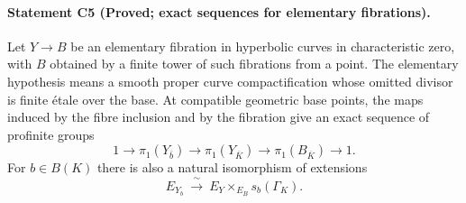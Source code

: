 \paragraph{Statement C5 (Proved; exact sequences for elementary fibrations).}\label{res:C5}
Let $Y\to B$ be an elementary fibration in hyperbolic curves in characteristic zero, with $B$ obtained by a finite tower of such fibrations from a point. The elementary hypothesis means a smooth proper curve compactification whose omitted divisor is finite étale over the base. At compatible geometric base points, the maps induced by the fibre inclusion and by the fibration give an exact sequence of profinite groups
\[
 1\longrightarrow\pi_1(Y_{\bar b})\longrightarrow\pi_1(Y_{\overline K})
 \longrightarrow\pi_1(B_{\overline K})\longrightarrow1.
\]
For $b\in B(K)$ there is also a natural isomorphism of extensions
\[
 E_{Y_b}\ \xrightarrow{\ \sim\ }\ E_Y\times_{E_B}s_b(\Gamma_K).
\]
